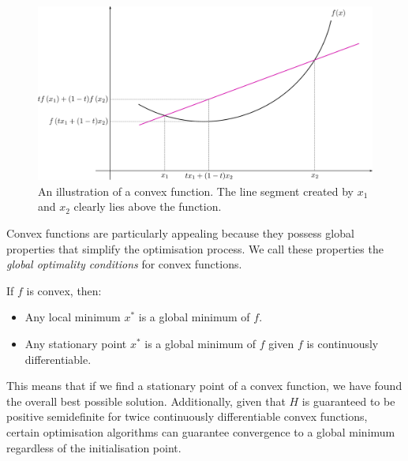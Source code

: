 \begin{figure}[h]
    \centering
    \includegraphics[width=0.9\linewidth]{figures/2background/ConvexFunction.svg.png}
    \caption{An illustration of a convex function. The line segment created by $x_1$ and $x_2$ clearly lies above the function.}
    \label{fig:convex_function}
\end{figure}

Convex functions are particularly appealing because they possess global properties that simplify the optimisation process. We call these properties the \textit{global optimality conditions} for convex functions.

\begin{definition}
    If $f$ is convex, then: 
    \begin{itemize}
        \item Any local minimum $x^*$ is a global minimum of $f$.
        \item Any stationary point $x^*$ is a global minimum of $f$ given $f$ is continuously differentiable.
    \end{itemize}
\end{definition}

This means that if we find a stationary point of a convex function, we have found the overall best possible solution. Additionally, given that $H$ is guaranteed to be positive semidefinite for twice continuously differentiable convex functions, certain optimisation algorithms can guarantee convergence to a global minimum regardless of the initialisation point. 

